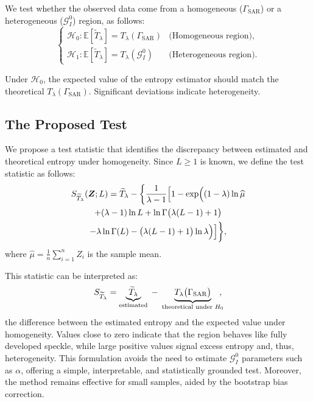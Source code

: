 \documentclass[
  lettersize  journal,
]{IEEEtran}%
\begin{document}
We test whether the observed data come from a homogeneous
(\(\Gamma_{\text{SAR}}\)) or a heterogeneous (\(\mathcal{G}^0_I\))
region, as follows: \begin{equation}\label{eq:hypothesis_test}
\begin{cases}
\mathcal{H}_0: \mathbb{E}[\widetilde{T}_{\lambda}] = T_{\lambda}(\Gamma_{\text{SAR}}) & \text{(Homogeneous region)}, \\[6pt]
\mathcal{H}_1: \mathbb{E}[\widetilde{T}_{\lambda}] = T_{\lambda}(\mathcal{G}^0_I) & \text{(Heterogeneous region)}.
\end{cases}
\end{equation}

Under \(\mathcal{H}_0\), the expected value of the entropy estimator
should match the theoretical \(T_{\lambda}(\Gamma_{\text{SAR}})\).
Significant deviations indicate heterogeneity.

\subsection{The Proposed Test}\label{the-proposed-test}

We propose a test statistic that identifies the discrepancy between
estimated and theoretical entropy under homogeneity. Since \(L\geq1\) is
known, we define the test statistic as follows: \begin{multline}
\label{eq-test-tsallis}
S_{\widetilde{T}_{\lambda}}(\bm{Z}; L) = \widetilde{T}_{\lambda} - \biggl\{ \frac{1}{\lambda - 1} \Bigl[ 1 -
\exp\Bigl(
(1 - \lambda)\ln \widehat{\mu}\\
+ (\lambda - 1)\ln L
+ \ln\Gamma\bigl(\lambda(L - 1) + 1\bigr) \\
- \lambda\ln\Gamma(L)
- \bigl(\lambda(L - 1) + 1\bigr)\ln \lambda
\Bigr) \Bigr] \biggr\},
\end{multline} where \(\widehat{\mu} = \frac{1}{n} \sum_{i=1}^n Z_i\) is
the sample mean.

This statistic can be interpreted as: \[
S_{\widetilde T_\lambda} 
= 
\underbrace{\widetilde T_\lambda}_{\text{estimated}} 
\;-\;
\underbrace{T_\lambda\bigl(\Gamma_{\mathrm{SAR}}\bigr)}_{\text{theoretical under } H_0}\hspace{-0.5em},
\] the difference between the estimated entropy and the expected value
under homogeneity. Values close to zero indicate that the region behaves
like fully developed speckle, while large positive values signal excess
entropy and, thus, heterogeneity. This formulation avoids the need to
estimate \(\mathcal{G}^0_I\) parameters such as \(\alpha\), offering a
simple, interpretable, and statistically grounded test. Moreover, the
method remains effective for small samples, aided by the bootstrap bias
correction.
\end{document}
